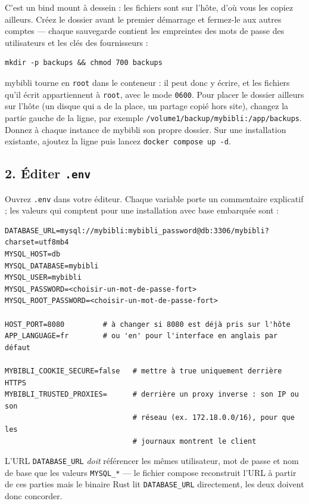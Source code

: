 C'est un bind mount à dessein : les fichiers sont sur l'hôte, d'où vous
les copiez ailleurs. Créez le dossier avant le premier démarrage et
fermez-le aux autres comptes --- chaque sauvegarde contient les
empreintes des mots de passe des utilisateurs et les clés des
fournisseurs :

\begin{lstlisting}
mkdir -p backups && chmod 700 backups
\end{lstlisting}

mybibli tourne en \texttt{root} dans le conteneur : il peut donc y
écrire, et les fichiers qu'il écrit appartiennent à \texttt{root}, avec
le mode \texttt{0600}. Pour placer le dossier ailleurs sur l'hôte (un
disque qui a de la place, un partage copié hors site), changez la partie
gauche de la ligne, par exemple
\texttt{/volume1/backup/mybibli:/app/backups}. Donnez à chaque instance
de mybibli son propre dossier. Sur une installation existante, ajoutez
la ligne puis lancez \texttt{docker compose up -d}.

\subsection*{2. Éditer \texttt{.env}}

Ouvrez \texttt{.env} dans votre éditeur. Chaque variable porte un
commentaire explicatif ; les valeurs qui comptent pour une
installation avec base embarquée sont :

\begin{lstlisting}
DATABASE_URL=mysql://mybibli:mybibli_password@db:3306/mybibli?charset=utf8mb4
MYSQL_HOST=db
MYSQL_DATABASE=mybibli
MYSQL_USER=mybibli
MYSQL_PASSWORD=<choisir-un-mot-de-passe-fort>
MYSQL_ROOT_PASSWORD=<choisir-un-mot-de-passe-fort>

HOST_PORT=8080         # à changer si 8080 est déjà pris sur l'hôte
APP_LANGUAGE=fr        # ou 'en' pour l'interface en anglais par défaut

MYBIBLI_COOKIE_SECURE=false   # mettre à true uniquement derrière HTTPS
MYBIBLI_TRUSTED_PROXIES=      # derrière un proxy inverse : son IP ou son
                              # réseau (ex. 172.18.0.0/16), pour que les
                              # journaux montrent le client
\end{lstlisting}

L'URL \texttt{DATABASE\_URL} \emph{doit} référencer les mêmes
utilisateur, mot de passe et nom de base que les valeurs
\texttt{MYSQL\_*} — le fichier compose reconstruit l'URL à partir de
ces parties mais le binaire Rust lit \texttt{DATABASE\_URL}
directement, les deux doivent donc concorder.

